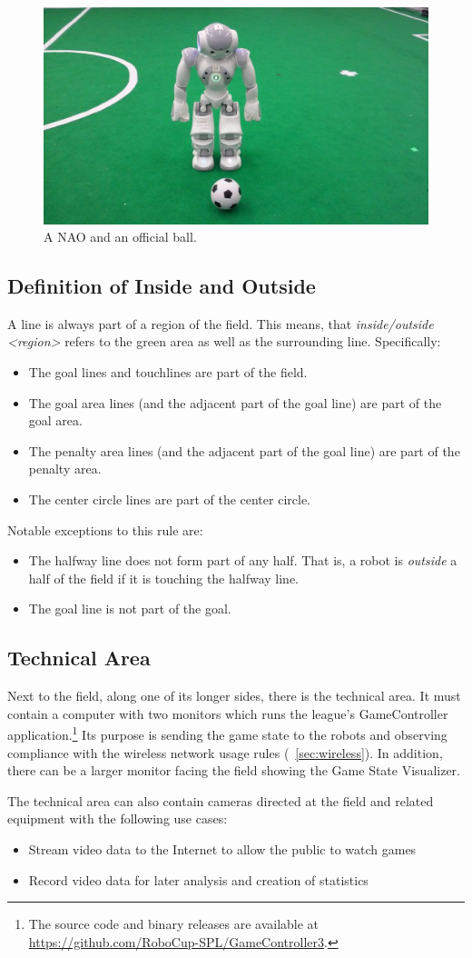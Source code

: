 \begin{figure}[t]
  \centerline{\includegraphics[height=0.28\columnwidth]{figs/robotWithBall2016.jpg}}
  \caption{A NAO and an official ball.}
  \label{fig:ball}
\end{figure}

\subsection{Definition of Inside and Outside}
\label{sec:inside_outside}

A line is always part of a region of the field.
This means, that \emph{inside/outside \textless region\textgreater} refers to the green area as well as the surrounding line.
Specifically:
\begin{itemize}
  \item The goal lines and touchlines are part of the field.
  \item The goal area lines (and the adjacent part of the goal line) are part of the goal area.
  \item The penalty area lines (and the adjacent part of the goal line) are part of the penalty area.
  \item The center circle lines are part of the center circle.
\end{itemize}

Notable exceptions to this rule are:
\begin{itemize}
  \item The halfway line does not form part of any half.
    That is, a robot is \textit{outside} a half of the field if it is touching the halfway line.
  \item The goal line is not part of the goal.
\end{itemize}

\subsection{Technical Area}
\label{sec:technical_area}

Next to the field, along one of its longer sides, there is the technical area.
It must contain a computer with two monitors which runs the league's GameController application.\footnote{
  The source code and binary releases are available at \url{https://github.com/RoboCup-SPL/GameController3}.
}
Its purpose is sending the game state to the robots and observing compliance with the wireless network usage rules (\cf~\cref{sec:wireless}).
In addition, there can be a larger monitor facing the field showing the Game State Visualizer.

The technical area can also contain cameras directed at the field and related equipment with the following use cases:
\begin{itemize}
  \item Stream video data to the Internet to allow the public to watch games
  \item Record video data for later analysis and creation of statistics
\end{itemize}
